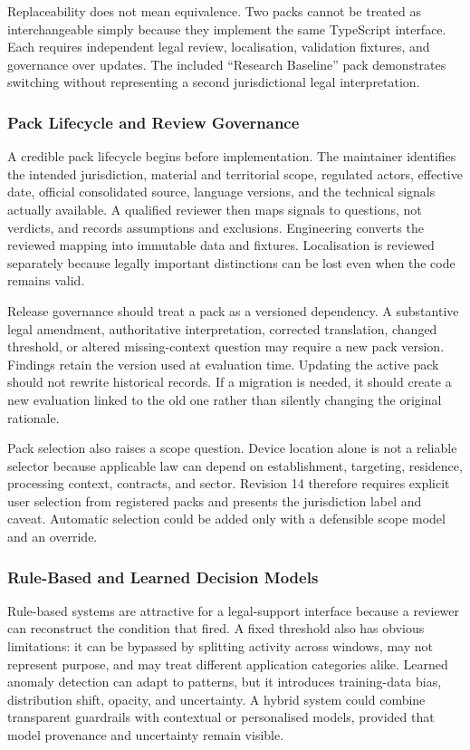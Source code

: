 Replaceability does not mean equivalence. Two packs cannot be treated as interchangeable simply because they implement the same TypeScript interface. Each requires independent legal review, localisation, validation fixtures, and governance over updates. The included ``Research Baseline'' pack demonstrates switching without representing a second jurisdictional legal interpretation.

\subsubsection{Pack Lifecycle and Review Governance}

A credible pack lifecycle begins before implementation. The maintainer identifies the intended jurisdiction, material and territorial scope, regulated actors, effective date, official consolidated source, language versions, and the technical signals actually available. A qualified reviewer then maps signals to questions, not verdicts, and records assumptions and exclusions. Engineering converts the reviewed mapping into immutable data and fixtures. Localisation is reviewed separately because legally important distinctions can be lost even when the code remains valid.

Release governance should treat a pack as a versioned dependency. A substantive legal amendment, authoritative interpretation, corrected translation, changed threshold, or altered missing-context question may require a new pack version. Findings retain the version used at evaluation time. Updating the active pack should not rewrite historical records. If a migration is needed, it should create a new evaluation linked to the old one rather than silently changing the original rationale.

Pack selection also raises a scope question. Device location alone is not a reliable selector because applicable law can depend on establishment, targeting, residence, processing context, contracts, and sector. Revision 14 therefore requires explicit user selection from registered packs and presents the jurisdiction label and caveat. Automatic selection could be added only with a defensible scope model and an override.

\subsubsection{Rule-Based and Learned Decision Models}

Rule-based systems are attractive for a legal-support interface because a reviewer can reconstruct the condition that fired. A fixed threshold also has obvious limitations: it can be bypassed by splitting activity across windows, may not represent purpose, and may treat different application categories alike. Learned anomaly detection can adapt to patterns, but it introduces training-data bias, distribution shift, opacity, and uncertainty. A hybrid system could combine transparent guardrails with contextual or personalised models, provided that model provenance and uncertainty remain visible.

